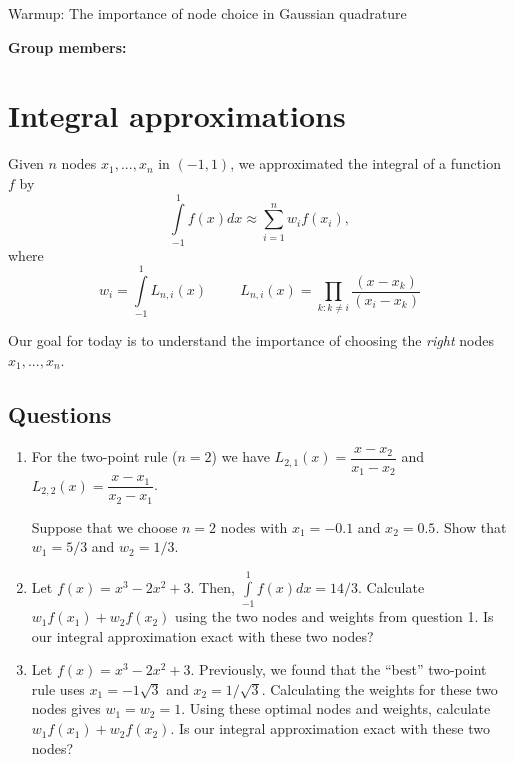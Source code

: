 \documentclass[12pt]{article}
\begin{document}
\begin{center}
\Large
Warmup: The importance of node choice in Gaussian quadrature \\
\normalsize
\vspace{5mm}
\end{center}

\noindent \textbf{Group members:}

\section*{Integral approximations}

Given $n$ nodes $x_1,...,x_n$ in $(-1, 1)$, we approximated the integral of a function $f$ by
$$\int \limits_{-1}^1 f(x) dx \approx \sum \limits_{i=1}^n w_i f(x_i),$$
where
$$w_i = \int \limits_{-1}^1 L_{n,i}(x) \hspace{1cm} L_{n,i}(x) = \prod \limits_{k : k \neq i} \frac{(x - x_k)}{(x_i - x_k)}$$

\noindent Our goal for today is to understand the importance of choosing the \textit{right} nodes $x_1,...,x_n$.

\subsection*{Questions}

\begin{enumerate}
\item For the two-point rule ($n = 2$) we have $L_{2,1}(x) = \dfrac{x - x_2}{x_1 - x_2}$ and $L_{2,2}(x) = \dfrac{x - x_1}{x_2 - x_1}$.

Suppose that we choose $n=2$ nodes with $x_1 = -0.1$ and $x_2 = 0.5$. Show that $w_1 = 5/3$ and $w_2 = 1/3$.

\newpage

\item Let $f(x) = x^3 - 2x^2 + 3$. Then, $\int \limits_{-1}^1 f(x) dx = 14/3$. Calculate $w_1f(x_1) + w_2f(x_2)$ using the two nodes and weights from question 1. Is our integral approximation exact with these two nodes?

\vspace{4cm}

\item Let $f(x) = x^3 - 2x^2 + 3$. Previously, we found that the ``best'' two-point rule uses $x_1 = -1\sqrt{3}$ and $x_2 = 1/\sqrt{3}$. Calculating the weights for these two nodes gives $w_1 = w_2 = 1$. Using these optimal nodes and weights, calculate $w_1f(x_1) + w_2f(x_2)$. Is our integral approximation exact with these two nodes?
\end{enumerate}
\end{document}
